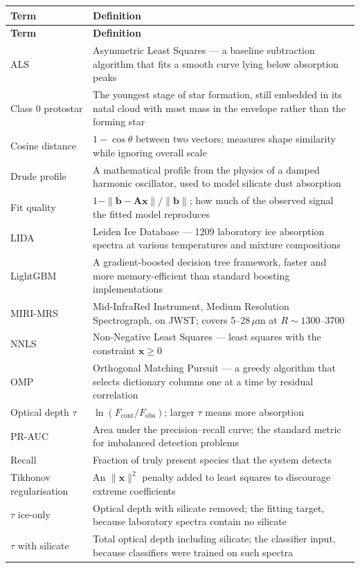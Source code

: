 \documentclass[11pt,a4paper]{article}
\newcommand{\um}{\,$\mu$m}
\begin{document}
\small
\begin{longtable}{@{}L{3.6cm}L{11.4cm}@{}}
\toprule
\textbf{Term} & \textbf{Definition} \\
\midrule
\endfirsthead
\toprule
\textbf{Term} & \textbf{Definition} \\
\midrule
\endhead
ALS & Asymmetric Least Squares --- a baseline subtraction algorithm that
fits a smooth curve lying below absorption peaks \\
Class 0 protostar & The youngest stage of star formation, still embedded in
its natal cloud with most mass in the envelope rather than the forming star \\
Cosine distance & $1 - \cos\theta$ between two vectors; measures shape
similarity while ignoring overall scale \\
Drude profile & A mathematical profile from the physics of a damped
harmonic oscillator, used to model silicate dust absorption \\
Fit quality & $1 - \|\mathbf{b}-\mathbf{A}\mathbf{x}\| / \|\mathbf{b}\|$;
how much of the observed signal the fitted model reproduces \\
LIDA & Leiden Ice Database --- 1209 laboratory ice absorption spectra at
various temperatures and mixture compositions \\
LightGBM & A gradient-boosted decision tree framework, faster and more
memory-efficient than standard boosting implementations \\
MIRI-MRS & Mid-InfraRed Instrument, Medium Resolution Spectrograph, on
JWST; covers 5--28\um{} at $R\sim1300$--3700 \\
NNLS & Non-Negative Least Squares --- least squares with the constraint
$\mathbf{x}\ge0$ \\
OMP & Orthogonal Matching Pursuit --- a greedy algorithm that selects
dictionary columns one at a time by residual correlation \\
Optical depth $\tau$ & $\ln(F_{\text{cont}}/F_{\text{obs}})$; larger
$\tau$ means more absorption \\
PR-AUC & Area under the precision--recall curve; the standard metric for
imbalanced detection problems \\
Recall & Fraction of truly present species that the system detects \\
Tikhonov regularisation & An $\|\mathbf{x}\|^2$ penalty added to least
squares to discourage extreme coefficients \\
$\tau$ ice-only & Optical depth with silicate removed; the fitting target,
because laboratory spectra contain no silicate \\
$\tau$ with silicate & Total optical depth including silicate; the
classifier input, because classifiers were trained on such spectra \\
\bottomrule
\end{longtable}
\normalsize
\end{document}
